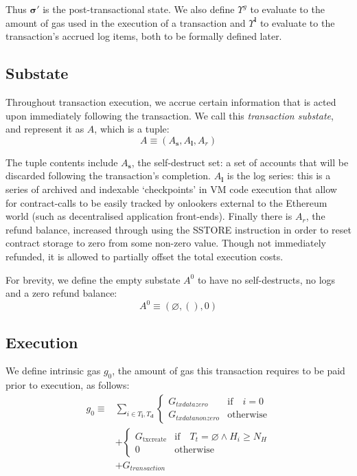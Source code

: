 \documentclass[9pt,oneside]{amsart}
\newcommand{\firsthomesteadblock}{\ensuremath{N_H}}
\begin{document}
\begin{multicols}{2}
Thus $\boldsymbol{\sigma}'$ is the post-transactional state. We also define $\Upsilon^g$ to evaluate to the amount of gas used in the execution of a transaction and $\Upsilon^\mathbf{l}$ to evaluate to the transaction's accrued log items, both to be formally defined later.

\subsection{Substate}
Throughout transaction execution, we accrue certain information that is acted upon immediately following the transaction. We call this \textit{transaction substate}, and represent it as $A$, which is a tuple:
\begin{equation}
A \equiv (A_\mathbf{s}, A_\mathbf{l}, A_r)
\end{equation}

The tuple contents include $A_\mathbf{s}$, the self-destruct set: a set of accounts that will be discarded following the transaction's completion. $A_\mathbf{l}$ is the log series: this is a series of archived and indexable `checkpoints' in VM code execution that allow for contract-calls to be easily tracked by onlookers external to the Ethereum world (such as decentralised application front-ends). Finally there is $A_r$, the refund balance, increased through using the {\small SSTORE} instruction in order to reset contract storage to zero from some non-zero value. Though not immediately refunded, it is allowed to partially offset the total execution costs.

For brevity, we define the empty substate $A^0$ to have no self-destructs, no logs and a zero refund balance:
\begin{equation}
A^0 \equiv (\varnothing, (), 0)
\end{equation}

\subsection{Execution}
We define intrinsic gas $g_0$, the amount of gas this transaction requires to be paid prior to execution, as follows:
\begin{align}
g_0 \equiv {} & \sum_{i \in T_\mathbf{i}, T_\mathbf{d}} \begin{cases} G_{txdatazero} & \text{if} \quad i = 0 \\ G_{txdatanonzero} & \text{otherwise} \end{cases} \\
{} & + \begin{cases} G_\text{txcreate} & \text{if} \quad T_t = \varnothing \wedge H_i \geq \firsthomesteadblock \\ 0 & \text{otherwise} \end{cases} \\
{} & + G_{transaction}
\end{align}


\end{multicols}
\end{document}
